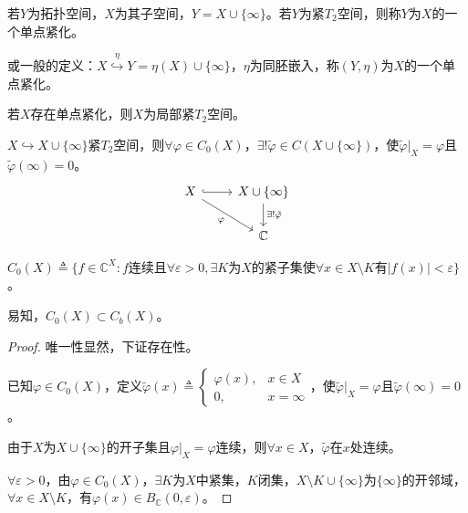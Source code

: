 \documentclass[lang=cn,a4paper,newtx,section]{elegantbook}
\begin{document}
\begin{definition}[单点紧化]
  若$Y$为拓扑空间，$X$为其子空间，$Y = X \cup \{\infty\}$。若$Y$为紧$T_2$空间，则称$Y$为$X$的一个单点紧化。
  
  或一般的定义：$X \overset{\eta}{\hookrightarrow} Y = \eta(X) \cup \{\infty\}$，$\eta$为同胚嵌入，称$(Y, \eta)$为$X$的一个单点紧化。
\end{definition}

\begin{proposition}
  若$X$存在单点紧化，则$X$为局部紧$T_2$空间。
\end{proposition}

\begin{proposition}
  $X \hookrightarrow X \cup \{\infty\}$紧$T_2$空间，则$\forall \varphi \in C_0(X)$，$\exists! \tilde{\varphi} \in C(X \cup \{\infty\})$，使$\tilde{\varphi}|_X = \varphi$且$\tilde{\varphi}(\infty) = 0$。
  \begin{equation*}
    \begin{tikzcd}
      X \arrow[r, hook] \arrow[rd, "\varphi"'] & X \cup \{\infty\} \arrow[d, "\exists! \tilde{\varphi}"] \\
      & \mathbb{C}
    \end{tikzcd}
  \end{equation*}
\end{proposition}

\begin{remark}
  $C_0(X) \triangleq \{f \in \mathbb{C}^X : f\text{连续且}\forall \varepsilon > 0, \exists K\text{为}X\text{的紧子集使}\forall x \in X \setminus K\text{有}|f(x)| < \varepsilon\}$。
  
  易知，$C_0(X) \subset C_b(X)$。
\end{remark}

\begin{proof}
  唯一性显然，下证存在性。
  
  已知$\varphi \in C_0(X)$，定义$\tilde{\varphi}(x) \triangleq \begin{cases} \varphi(x), & x \in X \\ 0, & x = \infty \end{cases}$，使$\tilde{\varphi}|_X = \varphi$且$\tilde{\varphi}(\infty) = 0$。
  
  由于$X$为$X \cup \{\infty\}$的开子集且$\varphi|_X = \varphi$连续，则$\forall x \in X$，$\tilde{\varphi}$在$x$处连续。
  
  $\forall \varepsilon > 0$，由$\varphi \in C_0(X)$，$\exists K$为$X$中紧集，$K$闭集，$X \setminus K \cup \{\infty\}$为$\{\infty\}$的开邻域，$\forall x \in X \setminus K$，有$\varphi(x) \in B_{\mathbb{C}}(0, \varepsilon)$。
\end{proof}
\end{document}
